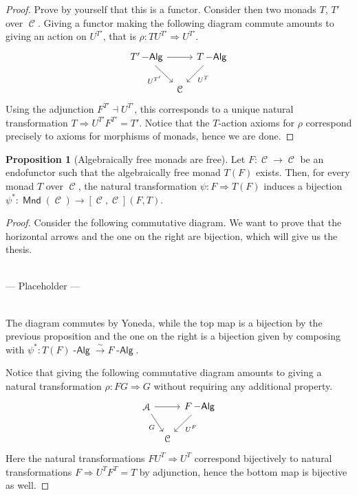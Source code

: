 \documentclass[a4paper,11pt,oneside,openany]{scrbook}
\DeclareMathOperator{\Alg}{-\mathsf{Alg}}
\DeclareMathOperator{\A}{\mathcal{A}}
\DeclareMathOperator{\C}{\mathcal{C}}
\DeclareMathOperator{\Mnd}{\mathsf{Mnd}}
\theoremstyle{definition}
\theoremstyle{definition}
\newtheorem{prop}[thm]{Proposition}
\begin{document}
\begin{proof}
    Prove by yourself that this is a functor. Consider then two monads $T$, $T'$ over $\C$. Giving a functor making the following diagram commute amounts to giving an action on $U^{T'}$, that is $\rho\colon TU^{T'}\Rightarrow U^{T'}$.
    \[
    \begin{tikzcd}[column sep=tiny]
        T'\Alg\ar[rr]\ar[dr, swap, "U^{T'}"]
        && T\Alg\ar[dl, "U^T"] \\
        & \C
    \end{tikzcd}
    \]
    Using the adjunction $F^{T'}\dashv U^{T'}$, this corresponds to a unique natural transformation $T\Rightarrow U^{T'}F^{T'}=T'$. Notice that the $T$-action axioms for $\rho$ correspond precisely to axioms for morphisms of monads, hence we are done.
\end{proof}

\begin{prop}[Algebraically free monads are free]
    Let $F\colon\C\rightarrow\C$ be an endofunctor such that the algebraically free monad $T(F)$ exists. Then, for every monad $T$ over $\C$, the natural transformation $\psi\colon F\Rightarrow T(F)$ induces a bijection $\psi^*\colon\Mnd(\C)\rightarrow [\C,\C](F,T)$.
\end{prop}

\begin{proof}
    Consider the following commutative diagram. We want to prove that the horizontal arrows and the one on the right are bijection, which will give us the thesis.
    
    ~\\
    
    --- Placeholder ---
    
    ~\\
    
    The diagram commutes by Yoneda, while the top map is a bijection by the previous proposition and the one on the right is a bijection given by composing with $\psi^*\colon T(F)\Alg\xrightarrow{\sim}F\Alg$.

    Notice that giving the following commutative diagram amounts to giving a natural transformation $\rho\colon FG\Rightarrow G$ without requiring any additional property.
    \[
    \begin{tikzcd}[column sep=tiny]
        \A\ar[rr]\ar[dr, swap, "G"]
        && F\Alg\ar[dl, "U^F"] \\
        & \C
    \end{tikzcd}
    \]
    Here the natural transformations $FU^T\Rightarrow U^T$ correspond bijectively to natural transformations $F\Rightarrow U^TF^T=T$ by adjunction, hence the bottom map is bijective as well.
\end{proof}
\end{document}
